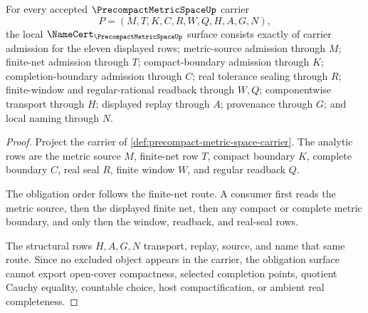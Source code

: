 \begin{theorem}
\label{thm:precompact-metric-space-namecert-obligations}
For every accepted $\PrecompactMetricSpaceUp$ carrier
$$
P=(M,T,K,C,R,W,Q,H,A,G,N),
$$
the local $\NameCert_{\PrecompactMetricSpaceUp}$ surface consists exactly of carrier admission for the eleven displayed rows; metric-source admission through $M$; finite-net admission through $T$; compact-boundary admission through $K$; completion-boundary admission through $C$; real tolerance sealing through $R$; finite-window and regular-rational readback through $W,Q$; componentwise transport through $H$; displayed replay through $A$; provenance through $G$; and local naming through $N$.
\end{theorem}
\begin{proof}
Project the carrier of \autoref{def:precompact-metric-space-carrier}. The analytic rows are the metric source $M$, finite-net row $T$, compact boundary $K$, complete boundary $C$, real seal $R$, finite window $W$, and regular readback $Q$.

The obligation order follows the finite-net route. A consumer first reads the metric source, then the displayed finite net, then any compact or complete metric boundary, and only then the window, readback, and real-seal rows.

The structural rows $H,A,G,N$ transport, replay, source, and name that same route. Since no excluded object appears in the carrier, the obligation surface cannot export open-cover compactness, selected completion points, quotient Cauchy equality, countable choice, host compactification, or ambient real completeness.
\end{proof}

